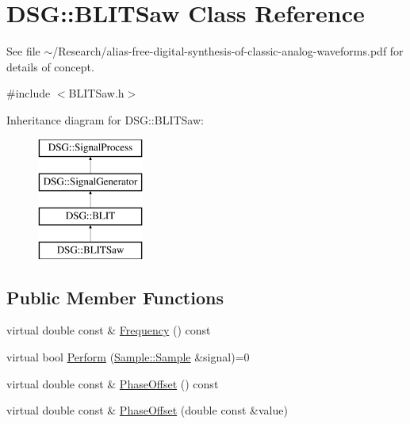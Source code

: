 \hypertarget{classDSG_1_1BLITSaw}{\section{D\+S\+G\+:\+:B\+L\+I\+T\+Saw Class Reference}
\label{classDSG_1_1BLITSaw}
}


See file $\sim$/\+Research/alias-\/free-\/digital-\/synthesis-\/of-\/classic-\/analog-\/waveforms.pdf for details of concept.  




{\ttfamily \#include $<$B\+L\+I\+T\+Saw.\+h$>$}

Inheritance diagram for D\+S\+G\+:\+:B\+L\+I\+T\+Saw\+:\begin{figure}[H]
\begin{center}
\leavevmode
\includegraphics[height=4.000000cm]{classDSG_1_1BLITSaw}
\end{center}
\end{figure}
\subsection*{Public Member Functions}
\begin{DoxyCompactItemize}
\item 
virtual double const \& \hyperlink{classDSG_1_1SignalGenerator_aedac746c5a70818d120858542ecb7c45}{Frequency} () const 
\item 
virtual bool \hyperlink{classDSG_1_1SignalProcess_afdb8220100418893950c1161dd24db67}{Perform} (\hyperlink{classDSG_1_1Sample_aaf2e30d73911eccea99b53eeee15b612}{Sample\+::\+Sample} \&signal)=0
\item 
virtual double const \& \hyperlink{classDSG_1_1SignalGenerator_a1ce521847edd0b837fd840998f906b4b}{Phase\+Offset} () const 
\item 
virtual double const \& \hyperlink{classDSG_1_1SignalGenerator_a08b71b1f30ba65e629642c570291dc0e}{Phase\+Offset} (double const \&value)
\end{DoxyCompactItemize}
